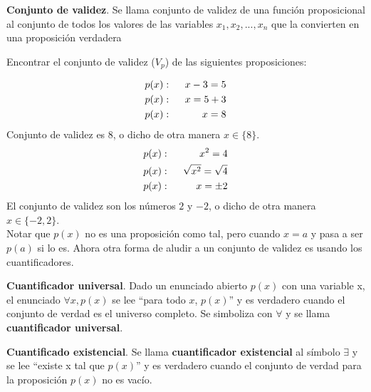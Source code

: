 \begin{mydef}\label{def:def444}
\textbf{Conjunto de validez}. Se llama conjunto de validez de una función proposicional al conjunto de todos los valores de las variables $x_{1}, x_{2},...,x_{n}$ que la convierten en una proposición verdadera 
\end{mydef}

\begin{myexample}
Encontrar el conjunto de validez ($V_{p}$) de las siguientes proposiciones:
\end{myexample}
\begin{eqnarray}
p(x)&:& \hspace{6px} x-3=5\nonumber\\
p(x)&:& \hspace{6px} x=5+3\nonumber\\
p(x)&:& \hspace{6px} x=8
\end{eqnarray}
Conjunto de validez es 8, o dicho de otra manera $x\in \{8\}$.\\

\begin{eqnarray}
p(x)&:& \hspace{6px} x^{2}=4\nonumber\\
p(x)&:& \hspace{6px} \sqrt{x^{2}}=\sqrt{4}\nonumber\\
p(x)&:& \hspace{6px} x=\pm 2
\end{eqnarray}
El conjunto de validez son los números $2$ y $-2$, o dicho de otra manera $x\in\{-2,2\}$.\\

Notar que $p(x)$ no es una proposición como tal, pero cuando $x=a$ y pasa a ser $p(a)$ si lo es. Ahora otra forma de aludir a un conjunto de validez es usando los cuantificadores. 

\begin{mydef}
\textbf{Cuantificador universal}. Dado un enunciado abierto $p(x)$ con una variable x, el enunciado $\forall x, p(x)$ se lee ``para todo $x$, $p(x)$'' y es verdadero cuando el conjunto de verdad es el universo completo. Se simboliza con $\forall$ y se llama \textbf{cuantificador universal}.
\end{mydef}

\begin{mydef}
\textbf{Cuantificado existencial}. Se llama \textbf{cuantificador existencial} al símbolo $\exists$ y se lee ``existe x tal que $p(x)$'' y es verdadero cuando el conjunto de verdad para la proposición $p(x)$ no es vacío.
\end{mydef}

